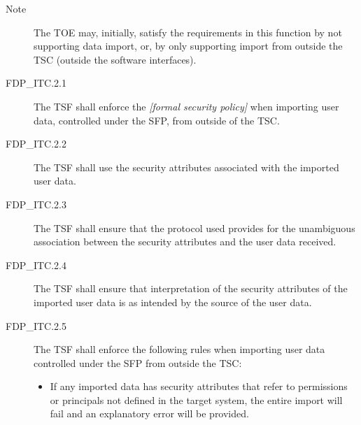 \documentclass[12pt,english]{scrbook}
\begin{document}



\begin{description}
\item[Note]

The TOE may, initially, satisfy the requirements in this
function by not supporting data import, or, by only
supporting import from outside the TSC (outside the
software interfaces).

\item[FDP{\_}ITC.2.1]

The TSF shall enforce the \emph{{[}formal security policy]} when importing user 
data, controlled under the SFP, from outside of the TSC.

\item[FDP{\_}ITC.2.2 ]

The TSF shall use the security attributes associated with the imported 
user data.

\item[FDP{\_}ITC.2.3]

The TSF shall ensure that the protocol used provides for the unambiguous 
association between the security attributes and the user data received.

\item[FDP{\_}ITC.2.4]

The TSF shall ensure that interpretation of the security attributes of 
the imported user data is as intended by the source of the user data.

\item[FDP{\_}ITC.2.5]

The TSF shall enforce the following rules when importing user data 
controlled under the SFP from outside the TSC:
\begin{itemize}
\item {} 
If any imported data has security attributes that refer to
permissions or principals not defined in the target system, the
entire import will fail and an explanatory error will be provided.

\end{itemize}

\end{description}
\end{document}

